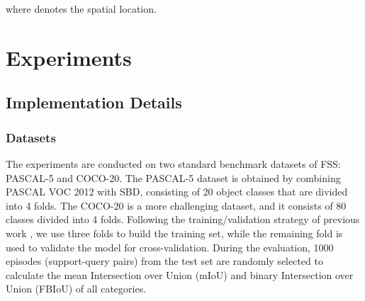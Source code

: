 \documentclass[lettersize,journal]{IEEEtran}
\begin{document}
where  denotes the spatial location.

\section{Experiments}
\subsection{Implementation Details}
\subsubsection{Datasets}
The experiments are conducted on two standard benchmark datasets of FSS: PASCAL-5\cite{RN74} and COCO-20\cite{RN75}. The PASCAL-5 dataset is obtained by combining PASCAL VOC 2012 with SBD\cite{RN77}, consisting of 20 object classes that are divided into 4 folds. The COCO-20\cite{RN75} is a more challenging dataset, and it consists of 80 classes divided into 4 folds. Following the training/validation strategy of previous work\cite{RN24,RN13,RN7,RN6,RN9} , we use three folds to build the training set, while the remaining fold is used to validate the model for cross-validation. During the evaluation, 1000 episodes (support-query pairs) from the test set are randomly selected to calculate the mean Intersection over Union (mIoU) and binary Intersection over Union (FBIoU) of all categories.
\end{document}
